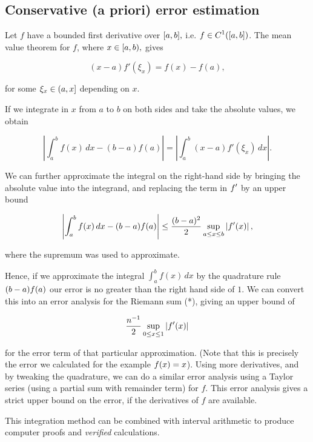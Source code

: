 \documentclass[a4paper]{article}
\begin{document}
\subsection{Conservative (a priori) error estimation}
Let $f$ have a bounded first derivative over ${\displaystyle [a,b],}$ i.e. ${\displaystyle f\in C^{1}([a,b])}$. The mean value theorem for $f$, where ${\displaystyle x\in [a,b),}$ gives

\begin{equation*}
	(x-a)f'(\xi _{x})=f(x)-f(a),
\end{equation*}

for some ${\displaystyle \xi _{x}\in (a,x]}$ depending on $x$.

If we integrate in $x$ from $a$ to $b$ on both sides and take the absolute values, we obtain

\begin{equation*}
	\left|\int _{a}^{b}f(x)\,dx-(b-a)f(a)\right|=\left|\int _{a}^{b}(x-a)f'(\xi _{x})\,dx\right|.
\end{equation*}

We can further approximate the integral on the right-hand side by bringing the absolute value into the integrand, and replacing the term in ${\displaystyle f'}$ by an upper bound

\begin{equation*}
	\left|\int _{a}^{b}f(x)\,dx-(b-a)f(a)\right|\leq {(b-a)^{2} \over 2}\sup _{a\leq x\leq b}\left|f'(x)\right|,
\end{equation*}

where the supremum was used to approximate.

Hence, if we approximate the integral $ \int _{a}^{b}f(x)\,dx$ by the quadrature rule ${\displaystyle (b-a)f(a)}$ our error is no greater than the right hand side of $1$. We can convert this into an error analysis for the Riemann sum (*), giving an upper bound of

\begin{equation*}
	{n^{-1} \over 2}\sup _{0\leq x\leq 1}\left|f'(x)\right|
\end{equation*}

for the error term of that particular approximation. (Note that this is precisely the error we calculated for the example ${\displaystyle f(x)=x}$). Using more derivatives, and by tweaking the quadrature, we can do a similar error analysis using a Taylor series (using a partial sum with remainder term) for $f$. This error analysis gives a strict upper bound on the error, if the derivatives of $f$ are available.

This integration method can be combined with interval arithmetic to produce computer proofs and \textit{verified} calculations.
\end{document}
